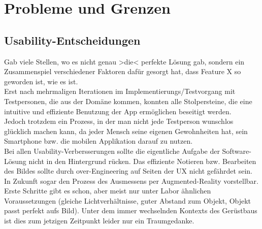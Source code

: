 \chapter{Probleme und Grenzen}
\section{Usability-Entscheidungen}
  Gab viele Stellen, wo es nicht genau >die< perfekte Lösung gab, sondern ein 
  Zusammenspiel verschiedener Faktoren dafür gesorgt hat, dass Feature X so geworden
  ist, wie es ist. \\
  
  Erst nach mehrmaligen Iterationen im Implementierungs/Testvorgang mit Testpersonen, 
  die aus der Domäne kommen, konnten alle Stolpersteine, die eine intuitive und 
  effiziente Benutzung der App ermöglichen beseitigt werden. \\
  
  Jedoch trotzdem ein Prozess, in der man nicht jede Testperson wunschlos glücklich machen kann,
  da jeder Mensch seine eigenen Gewohnheiten hat, sein Smartphone bzw. die mobilen Applikation darauf
  zu nutzen. \\

  Bei allen Usability-Verbersserungen sollte die eigentliche Aufgabe der Software-Lösung nicht in den
  Hintergrund rücken. Das effiziente Notieren bzw. Bearbeiten des Bildes sollte durch
  over-Engineering auf Seiten der UX nicht gefährdet sein. \\

  In Zukunft sogar den Prozess des Ausmessens per Augmented-Reality vorstellbar. Erste Schritte
  gibt es schon, aber meist nur unter Labor ähnlichen Voraussetzungen (gleiche Lichtverhältnisse, 
  guter Abstand zum Objekt, Objekt passt perfekt aufs Bild). Unter dem immer wechselnden Kontexts
  des Gerüstbaus ist dies zum jetzigen Zeitpunkt leider nur ein Traumgedanke. \\


